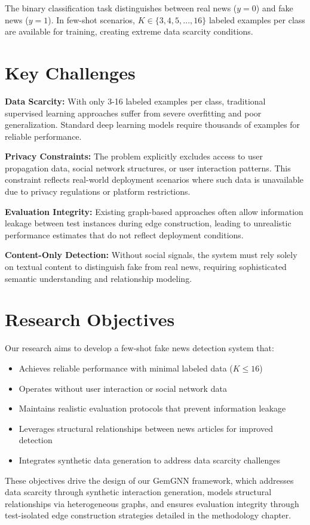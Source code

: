 The binary classification task distinguishes between real news ($y = 0$) and fake news ($y = 1$). In few-shot scenarios, $K \in \{3, 4, 5, ..., 16\}$ labeled examples per class are available for training, creating extreme data scarcity conditions.

\section{Key Challenges}

\textbf{Data Scarcity:} With only 3-16 labeled examples per class, traditional supervised learning approaches suffer from severe overfitting and poor generalization. Standard deep learning models require thousands of examples for reliable performance.

\textbf{Privacy Constraints:} The problem explicitly excludes access to user propagation data, social network structures, or user interaction patterns. This constraint reflects real-world deployment scenarios where such data is unavailable due to privacy regulations or platform restrictions.

\textbf{Evaluation Integrity:} Existing graph-based approaches often allow information leakage between test instances during edge construction, leading to unrealistic performance estimates that do not reflect deployment conditions.

\textbf{Content-Only Detection:} Without social signals, the system must rely solely on textual content to distinguish fake from real news, requiring sophisticated semantic understanding and relationship modeling.

\section{Research Objectives}

Our research aims to develop a few-shot fake news detection system that:

\begin{itemize}
\item Achieves reliable performance with minimal labeled data ($K \leq 16$)
\item Operates without user interaction or social network data
\item Maintains realistic evaluation protocols that prevent information leakage
\item Leverages structural relationships between news articles for improved detection
\item Integrates synthetic data generation to address data scarcity challenges
\end{itemize}

These objectives drive the design of our GemGNN framework, which addresses data scarcity through synthetic interaction generation, models structural relationships via heterogeneous graphs, and ensures evaluation integrity through test-isolated edge construction strategies detailed in the methodology chapter.

\EndChapter

